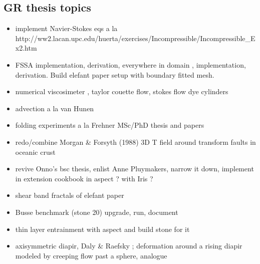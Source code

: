 \subsection{GR thesis topics}
\begin{itemize} 
\item implement Navier-Stokes eqs a la http://ww2.lacan.upc.edu/huerta/exercises/Incompressible/Incompressible\_Ex2.htm
\item FSSA implementation, derivation, everywhere in domain \cite{sctc20}, implementation, derivation. Build elefant paper
      setup with boundary fitted mesh.
\item numerical viscosimeter \cite{batt84}, taylor couette flow, stokes flow dye cylinders
\item advection a la van Hunen
\item folding experiments a la Frehner MSc/PhD thesis and papers 
\item redo/combine Morgan \& Forsyth (1988) \cite{mofo88} 3D T field around transform faults in oceanic crust
\item revive Onno's bsc thesis, enlist Anne Pluymakers, narrow it down, implement in extension 
      cookbook in aspect ? with Iris ?
\item shear band fractals of elefant paper
\item Busse benchmark (stone 20) upgrade, run, document
\item thin layer entrainment with aspect and build stone for it 
\item axisymmetric diapir, Daly \& Raefsky \cite{dara85}; deformation around a rising diapir modeled by creeping 
      flow past a sphere, analogue \cite{crud88}
\end{itemize}

